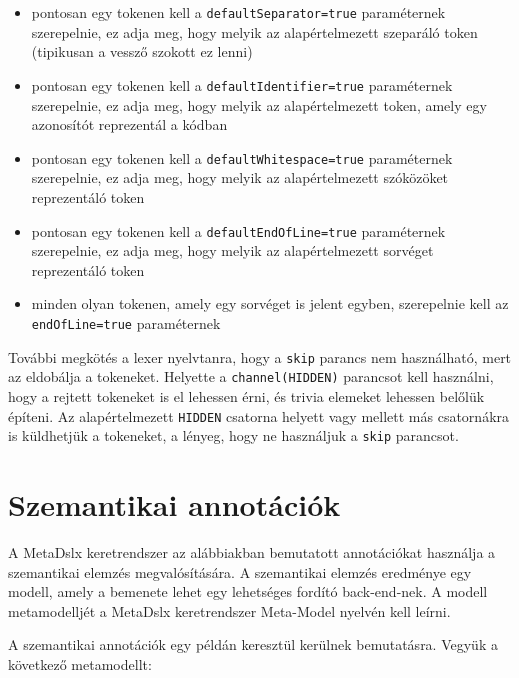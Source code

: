 \documentclass[12pt, a4paper]{report}
\newcommand{\f}[1]{\texttt{#1}}
\begin{document}
\begin{itemize}
	\item pontosan egy tokenen kell a \f{defaultSeparator=true} paraméternek szerepelnie, ez adja meg, hogy melyik az alapértelmezett szeparáló token (tipikusan a vessző szokott ez lenni)
	\item pontosan egy tokenen kell a \f{defaultIdentifier=true} paraméternek szerepelnie, ez adja meg, hogy melyik az alapértelmezett token, amely egy azonosítót reprezentál a kódban
	\item pontosan egy tokenen kell a \f{defaultWhitespace=true} paraméternek szerepelnie, ez adja meg, hogy melyik az alapértelmezett szóközöket reprezentáló token
	\item pontosan egy tokenen kell a \f{defaultEndOfLine=true} paraméternek szerepelnie, ez adja meg, hogy melyik az alapértelmezett sorvéget reprezentáló token
	\item minden olyan tokenen, amely egy sorvéget is jelent egyben, szerepelnie kell az \f{endOfLine=true} paraméternek
\end{itemize}

További megkötés a lexer nyelvtanra, hogy a \f{skip} parancs nem használható, mert az eldobálja a tokeneket. Helyette a \f{channel(HIDDEN)} parancsot kell használni, hogy a rejtett tokeneket is el lehessen érni, és trivia elemeket lehessen belőlük építeni. Az alapértelmezett \f{HIDDEN} csatorna helyett vagy mellett más csatornákra is küldhetjük a tokeneket, a lényeg, hogy ne használjuk a \f{skip} parancsot.

\section{Szemantikai annotációk}\label{SemanticAnnotations}

A MetaDslx keretrendszer az alábbiakban bemutatott annotációkat használja a szemantikai elemzés megvalósítására. A szemantikai elemzés eredménye egy modell, amely a bemenete lehet egy lehetséges fordító back-end-nek. A modell metamodelljét a MetaDslx keretrendszer Meta-Model nyelvén kell leírni.

A szemantikai annotációk egy példán keresztül kerülnek bemutatásra. Vegyük a következő metamodellt:
\end{document}
